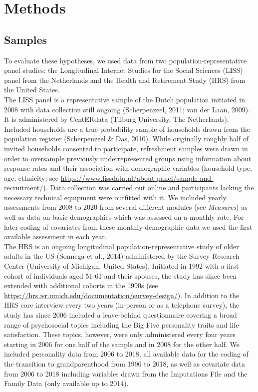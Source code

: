 \documentclass[
  english,
  man, noextraspace]{apa7}
\begin{document}
\hypertarget{methods}{%
\section{Methods}\label{methods}}

\hypertarget{samples}{%
\subsection{Samples}\label{samples}}

To evaluate these hypotheses, we used data from two population-representative panel studies: the Longitudinal Internet Studies for the Social Sciences (LISS) panel from the Netherlands and the Health and Retirement Study (HRS) from the United States.\\
The LISS panel is a representative sample of the Dutch population initiated in 2008 with data collection still ongoing (Scherpenzeel, 2011; van der Laan, 2009). It is administered by CentERdata (Tilburg University, The Netherlands). Included households are a true probability sample of households drawn from the population register (Scherpenzeel \& Das, 2010). While originally roughly half of invited households consented to participate, refreshment samples were drawn in order to oversample previously underrepresented groups using information about response rates and their association with demographic variables (household type, age, ethnicity; see \url{https://www.lissdata.nl/about-panel/sample-and-recruitment/}). Data collection was carried out online and participants lacking the necessary technical equipment were outfitted with it. We included yearly assessments from 2008 to 2020 from several different modules (see \emph{Measures}) as well as data on basic demographics which was assessed on a monthly rate. For later coding of covariates from these monthly demographic data we used the first available assessment in each year.\\
The HRS is an ongoing longitudinal population-representative study of older adults in the US (Sonnega et al., 2014) administered by the Survey Research Center (University of Michigan, United States). Initiated in 1992 with a first cohort of individuals aged 51-61 and their spouses, the study has since been extended with additional cohorts in the 1990s (see \url{https://hrs.isr.umich.edu/documentation/survey-design/}). In addition to the HRS core interview every two years (in-person or as a telephone survey), the study has since 2006 included a leave-behind questionnaire covering a broad range of psychosocial topics including the Big Five personality traits and life satisfaction. These topics, however, were only administered every four years starting in 2006 for one half of the sample and in 2008 for the other half. We included personality data from 2006 to 2018, all available data for the coding of the transition to grandparenthood from 1996 to 2018, as well as covariate data from 2006 to 2018 including variables drawn from the Imputations File and the Family Data (only available up to 2014).\\
\end{document}
